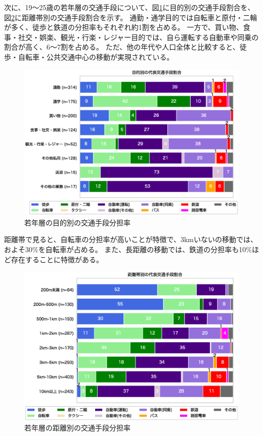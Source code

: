 \documentclass[a4paper,12pt, uplatex]{jsbook}
\begin{document}
\clearpage
次に、19〜25歳の若年層の交通手段について、図\ref{fig:mode_share_purpose_young}に目的別の交通手段割合を、図\ref{fig:mode_share_dist_young}に距離帯別の交通手段割合を示す。
通勤・通学目的では自転車と原付・二輪が多く、徒歩と鉄道の分担率もそれぞれ約1割を占める。
一方で、買い物、食事・社交・娯楽、観光・行楽・レジャー目的では、自ら運転する自動車や同乗の割合が高く、6〜7割を占める。
ただ、他の年代や人口全体と比較すると、徒歩・自転車・公共交通中心の移動が実現されている。
%
\begin{figure}[H]
    \centering
    \includegraphics[width=1.0\textwidth]{picture/mode_share_purpose_若年層.eps}
    \caption{若年層の目的別の交通手段分担率}
    \label{fig:mode_share_purpose_young}
\end{figure}

\clearpage
距離帯で見ると、自転車の分担率が高いことが特徴で、3kmいないの移動では、およそ30\%を自転車が占める。
また、長距離の移動では、鉄道の分担率も10\%ほど存在することに特徴がある。
%
\begin{figure}[H]
    \centering
    \includegraphics[width=1.0\textwidth]{picture/mode_share_distance_若年層.eps}
    \caption{若年層の距離別の交通手段分担率}
    \label{fig:mode_share_dist_young}
\end{figure}
\end{document}
